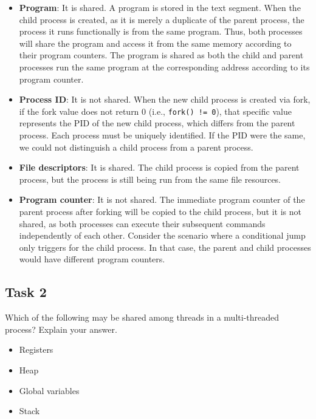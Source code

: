\documentclass[../main.tex]{subfiles}
\begin{document}
\begin{itemize}
    \item \textbf{Program}: It is shared. A program is stored in the text segment. When the child process is created, as it is merely a duplicate of the parent process, the process it runs functionally is from the same program. Thus, both processes will share the program and access it from the same memory according to their program counters. The program is shared as both the child and parent processes run the same program at the corresponding address according to its program counter.
    
    \item \textbf{Process ID}: It is not shared. When the new child process is created via fork, if the fork value does not return 0 (i.e., \lstinline{fork() != 0}), that specific value represents the PID of the new child process, which differs from the parent process. Each process must be uniquely identified. If the PID were the same, we could not distinguish a child process from a parent process.
    
    \item \textbf{File descriptors}: It is shared. The child process is copied from the parent process, but the process is still being run from the same file resources.
    
    \item \textbf{Program counter}: It is not shared. The immediate program counter of the parent process after forking will be copied to the child process, but it is not shared, as both processes can execute their subsequent commands independently of each other. Consider the scenario where a conditional jump only triggers for the child process. In that case, the parent and child processes would have different program counters.
\end{itemize}

\subsection{Task 2}

Which of the following may be shared among threads in a multi-threaded process? Explain your answer.

\begin{itemize}
    \item Registers
    \item Heap
    \item Global variables
    \item Stack
\end{itemize}
\end{document}
